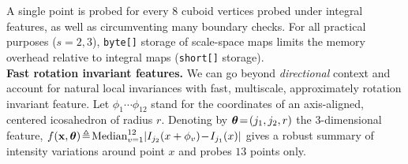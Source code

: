 A single point is probed for every $8$ cuboid vertices probed under integral features, as well as circumventing many boundary checks. For all practical purposes ($s=2,3$), \texttt{byte[]} storage of scale-space maps limits the memory 
overhead relative to integral maps (\texttt{short[]} storage).\\

\noindent
\textbf{Fast rotation invariant features.} We can go beyond \textit{directional} context and account for natural local invariances with fast, multiscale, approximately rotation invariant feature. Let $\phi_1\cdots\phi_{12}$ stand for the coordinates of an axis-aligned, centered icosahedron of radius $r$. Denoting by $\bm{\theta}\!=\!(j_1,j_2,r)$ the $3$-dimensional feature, $f(\boldsymbol{\mathrm{x}}, \bm{\theta})\!\triangleq\! \text{Median}_{v=1}^{12} \vert I_{j_2}(x+\phi_v)\!-\!I_{j_1}(x)\vert$ gives a robust summary of intensity variations around point $x$ and probes $13$ points only. %



